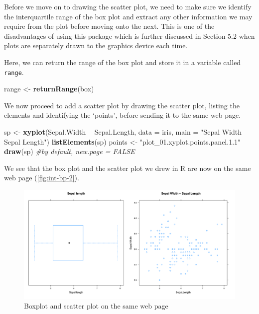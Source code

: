 \documentclass[11pt,]{report}
\newenvironment{Shaded}{\begin{snugshade}}{\end{snugshade}}
\newcommand{\KeywordTok}[1]{\textcolor[rgb]{0.13,0.29,0.53}{\textbf{#1}}}
\newcommand{\DataTypeTok}[1]{\textcolor[rgb]{0.13,0.29,0.53}{#1}}
\newcommand{\StringTok}[1]{\textcolor[rgb]{0.31,0.60,0.02}{#1}}
\newcommand{\CommentTok}[1]{\textcolor[rgb]{0.56,0.35,0.01}{\textit{#1}}}
\newcommand{\OperatorTok}[1]{\textcolor[rgb]{0.81,0.36,0.00}{\textbf{#1}}}
\newcommand{\NormalTok}[1]{#1}
\begin{document}
Before we move on to drawing the scatter plot, we need to make sure we
identify the interquartile range of the box plot and extract any other
information we may require from the plot before moving onto the next.
This is one of the disadvantages of using this package which is further
discussed in Section 5.2 when plots are separately drawn to the graphics
device each time.

Here, we can return the range of the box plot and store it in a variable
called \texttt{range}.

\begin{Shaded}
\begin{Highlighting}[]
\NormalTok{range <-}\StringTok{ }\KeywordTok{returnRange}\NormalTok{(box)}
\end{Highlighting}
\end{Shaded}

We now proceed to add a scatter plot by drawing the scatter plot,
listing the elements and identifying the `points', before sending it to
the same web page.

\begin{Shaded}
\begin{Highlighting}[]
\NormalTok{sp <-}\StringTok{ }\KeywordTok{xyplot}\NormalTok{(Sepal.Width }\OperatorTok{~}\StringTok{ }\NormalTok{Sepal.Length,}
             \DataTypeTok{data =}\NormalTok{ iris,}
             \DataTypeTok{main =} \StringTok{"Sepal Width ~ Sepal Length"}\NormalTok{)}
\KeywordTok{listElements}\NormalTok{(sp)}
\NormalTok{points <-}\StringTok{ "plot_01.xyplot.points.panel.1.1"}
\KeywordTok{draw}\NormalTok{(sp) }\CommentTok{#by default, new.page = FALSE}
\end{Highlighting}
\end{Shaded}

We see that the box plot and the scatter plot we drew in R are now on
the same web page (\autoref{fig:int-bp-2}).

\begin{figure}[H]

{\centering \includegraphics[width=0.7\linewidth,]{./fig/int-bp-2} 

}

\caption{\label{fig:int-bp-2} Boxplot and scatter plot on the same web page}\label{fig:unnamed-chunk-54}
\end{figure}
\end{document}
